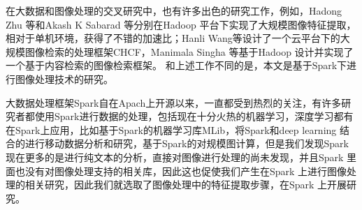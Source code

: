 在大数据和图像处理的交叉研究中，也有许多出色的研究工作，例如，Hadong Zhu 等和Akash K Sabarad 等分别在Hadoop 平台下实现了大规模图像特征提取，相对于单机环境，获得了不错的加速比；Hanli Wang等设计了一个云平台下的大规模图像检索的处理框架CHCF，Manimala Singha 等基于Hadoop 设计并实现了一个基于内容检索的图像检索框架。 和上述工作不同的是，本文是基于Spark下进行图像处理技术的研究。

大数据处理框架Spark自在Apach上开源以来，一直都受到热烈的关注，有许多研究者都使用Spark进行数据的处理，包括现在十分火热的机器学习，深度学习都有在Spark上应用，比如基于Spark的机器学习库MLib，将Spark和deep learning 结合的进行移动数据分析和研究，基于Spark的对规模图计算，但是我们发现Spark现在更多的是进行纯文本的分析，直接对图像进行处理的尚未发现，并且Spark 里面也没有对图像处理支持的相关库，因此这也促使我们产生在Spark 上进行图像处理的相关研究，因此我们就选取了图像处理中的特征提取步骤，在Spark 上开展研究。

